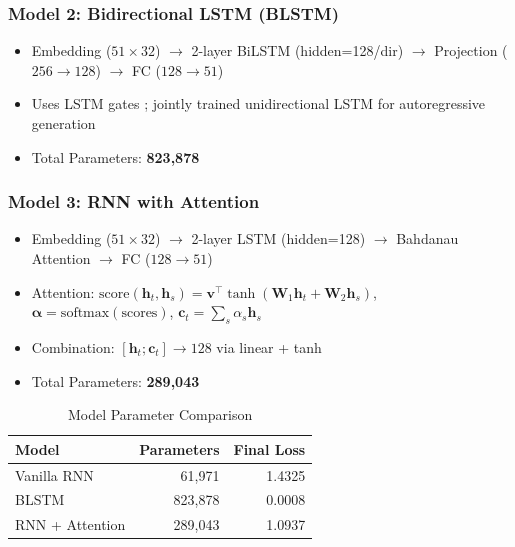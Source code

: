 \documentclass[11pt,a4paper]{article}
\begin{document}
\subsubsection{Model 2: Bidirectional LSTM (BLSTM)}
\begin{itemize}
    \item Embedding ($51 \times 32$) $\rightarrow$ 2-layer BiLSTM \cite{schuster1997bilstm} (hidden=128/dir) $\rightarrow$ Projection ($256 \rightarrow 128$) $\rightarrow$ FC ($128 \rightarrow 51$)
    \item Uses LSTM gates \cite{hochreiter1997lstm}; jointly trained unidirectional LSTM for autoregressive generation
    \item Total Parameters: \textbf{823,878}
\end{itemize}

\subsubsection{Model 3: RNN with Attention}
\begin{itemize}
    \item Embedding ($51 \times 32$) $\rightarrow$ 2-layer LSTM (hidden=128) $\rightarrow$ Bahdanau Attention \cite{bahdanau2015attention} $\rightarrow$ FC ($128 \rightarrow 51$)
    \item Attention: $\text{score}(\mathbf{h}_t, \mathbf{h}_s) = \mathbf{v}^\top \tanh(\mathbf{W}_1\mathbf{h}_t + \mathbf{W}_2\mathbf{h}_s)$, \quad $\boldsymbol{\alpha} = \text{softmax}(\text{scores})$, \quad $\mathbf{c}_t = \sum_s \alpha_s \mathbf{h}_s$
    \item Combination: $[\mathbf{h}_t; \mathbf{c}_t] \rightarrow 128$ via linear + tanh
    \item Total Parameters: \textbf{289,043}
\end{itemize}

\begin{table}[H]
\centering
\caption{Model Parameter Comparison}
\vspace{-0.5em}
\begin{tabular}{lrr}
\toprule
\textbf{Model} & \textbf{Parameters} & \textbf{Final Loss} \\
\midrule
Vanilla RNN & 61,971 & 1.4325 \\
BLSTM & 823,878 & 0.0008 \\
RNN + Attention & 289,043 & 1.0937 \\
\bottomrule
\end{tabular}
\end{table}
\end{document}

